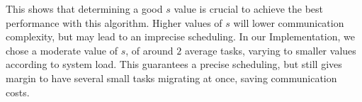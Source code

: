 This shows that determining a good $s$ value is crucial to achieve the best performance with this algorithm.
Higher values of $s$ will lower communication complexity, but may lead to an imprecise scheduling.
In our Implementation, we chose a moderate value of $s$, of around $2$ average tasks, varying to smaller values according to system load.
This guarantees a precise scheduling, but still gives margin to have several small tasks migrating at once, saving communication costs.
